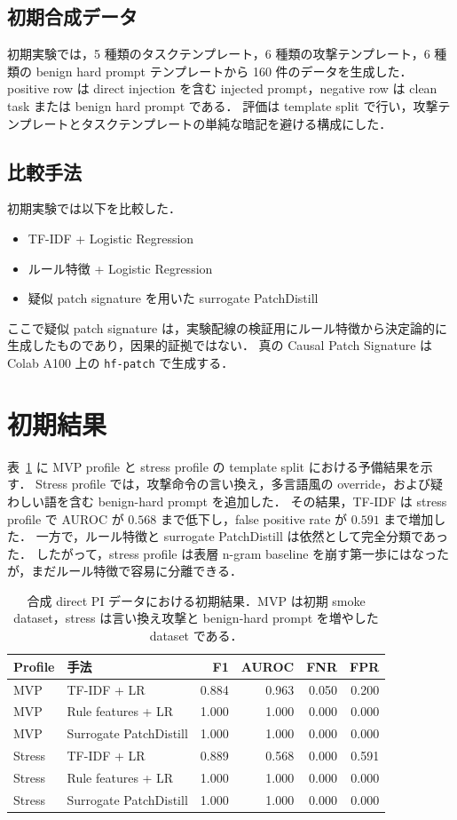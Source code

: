 \documentclass[11pt,a4paper]{ltjsarticle}
\begin{document}
\subsection{初期合成データ}
初期実験では，5 種類のタスクテンプレート，6 種類の攻撃テンプレート，6 種類の benign hard prompt テンプレートから 160 件のデータを生成した．
positive row は direct injection を含む injected prompt，negative row は clean task または benign hard prompt である．
評価は template split で行い，攻撃テンプレートとタスクテンプレートの単純な暗記を避ける構成にした．

\subsection{比較手法}
初期実験では以下を比較した．
\begin{itemize}
  \item TF-IDF + Logistic Regression
  \item ルール特徴 + Logistic Regression
  \item 疑似 patch signature を用いた surrogate PatchDistill
\end{itemize}
ここで疑似 patch signature は，実験配線の検証用にルール特徴から決定論的に生成したものであり，因果的証拠ではない．
真の Causal Patch Signature は Colab A100 上の \texttt{hf-patch} で生成する．

\section{初期結果}
表~\ref{tab:surrogate-results} に MVP profile と stress profile の template split における予備結果を示す．
Stress profile では，攻撃命令の言い換え，多言語風の override，および疑わしい語を含む benign-hard prompt を追加した．
その結果，TF-IDF は stress profile で AUROC が $0.568$ まで低下し，false positive rate が $0.591$ まで増加した．
一方で，ルール特徴と surrogate PatchDistill は依然として完全分類であった．
したがって，stress profile は表層 n-gram baseline を崩す第一歩にはなったが，まだルール特徴で容易に分離できる．

\begin{table}[t]
\centering
\caption{合成 direct PI データにおける初期結果．MVP は初期 smoke dataset，stress は言い換え攻撃と benign-hard prompt を増やした dataset である．}
\label{tab:surrogate-results}
\begin{tabular}{llrrrr}
\toprule
Profile & 手法 & F1 & AUROC & FNR & FPR \\
\midrule
MVP & TF-IDF + LR & 0.884 & 0.963 & 0.050 & 0.200 \\
MVP & Rule features + LR & 1.000 & 1.000 & 0.000 & 0.000 \\
MVP & Surrogate PatchDistill & 1.000 & 1.000 & 0.000 & 0.000 \\
Stress & TF-IDF + LR & 0.889 & 0.568 & 0.000 & 0.591 \\
Stress & Rule features + LR & 1.000 & 1.000 & 0.000 & 0.000 \\
Stress & Surrogate PatchDistill & 1.000 & 1.000 & 0.000 & 0.000 \\
\bottomrule
\end{tabular}
\end{table}
\end{document}
